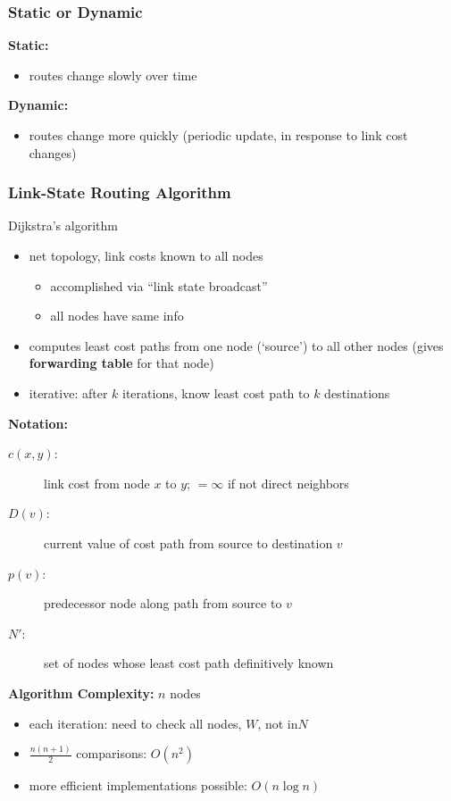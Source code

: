 \subsubsection{Static or Dynamic}
\textbf{Static:}
\begin{itemize}
	\item routes change slowly over time
\end{itemize}
\textbf{Dynamic:}
\begin{itemize}
	\item routes change more quickly (periodic update, in response to link cost changes)
\end{itemize}
\subsubsection{Link-State Routing Algorithm}
\begin{note}{Dijkstra's algorithm}
	\begin{itemize}
		\item net topology, link costs known to all nodes
		\begin{itemize}
			\item accomplished via ``link state broadcast''
			\item all nodes have same info
		\end{itemize}
		\item computes least cost paths from one node (`source') to all other nodes (gives \textbf{forwarding table} for that node)
		\item iterative: after $k$ iterations, know least cost path to $k$ destinations
	\end{itemize}
\end{note}
\textbf{Notation:}
\begin{description}
	\item[$c(x,y)$:] link cost from node $x$ to $y$; $=\infty$ if not direct neighbors
	\item[$D(v)$:] current value of cost path from source to destination $v$
	\item[$p(v)$:] predecessor node along path from source to $v$
	\item[$N'$:] set of nodes whose least cost path definitively known
\end{description}
\textbf{Algorithm Complexity:} $n$ nodes
\begin{itemize}
	\item each iteration: need to check all nodes, $W$, not in$N$
	\item $\frac{n(n+1)}{2}$ comparisons: $O(n^2)$
	\item more efficient implementations possible: $O(n\log n)$
\end{itemize}

